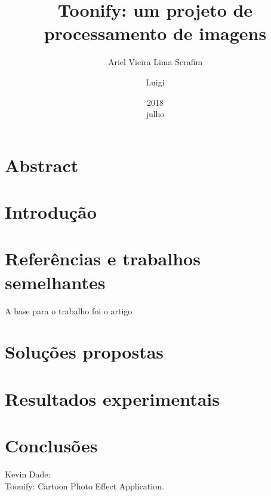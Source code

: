 \documentclass[10pt,technote]{IEEEtran}
\title{Toonify: um projeto de processamento de imagens}
\date{2018\\ julho}
\author{Ariel Vieira Lima Serafim\\ 
\and Luigi}
\begin{document}
	\maketitle
	\section*{Abstract}
	\section*{Introdução}
	\section*{Referências e trabalhos semelhantes}
		A base para o trabalho foi o artigo \cite{CITA-artigobase}
	\section*{Soluções propostas}
	\section*{Resultados experimentais}
	\section*{Conclusões}

	\begin{thebibliography}{20}
	Kevin Dade:\\
	Toonify: Cartoon Photo Effect Application.
	\end{thebibliography}
\end{document}
